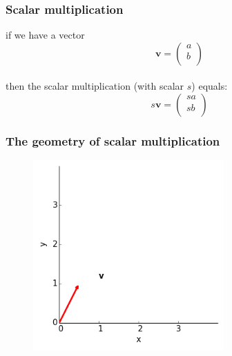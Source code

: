 \documentclass{beamer}
\begin{document}
\begin{frame}
\frametitle{Scalar multiplication}

if we have a vector $$\mathbf{v} = \left(
	\begin{array}{c}
	a\\
	b\\
	\end{array}
	\right)$$\\[1cm]
then the scalar multiplication (with scalar $s$) equals:
$$s\mathbf{v} = \left(
	\begin{array}{c}
	sa\\
	sb\\
	\end{array}
	\right)$$
\end{frame}
\begin{frame}
\frametitle{The geometry of scalar multiplication}

\begin{figure}[htbp]
\begin{center}
 \includegraphics[width=0.65\textwidth]{figure3a.png}
\caption{}
\end{center}
\end{figure}

\end{frame}
\end{document}
